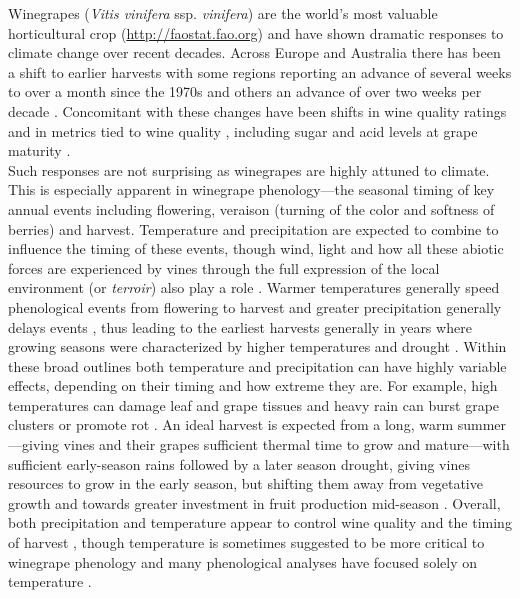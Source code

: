 \documentclass[11pt,a4paper,oneside]{article}
\begin{document}
Winegrapes (\emph{Vitis vinifera} ssp. \emph{vinifera}) are the world's most valuable horticultural crop (\url{http://faostat.fao.org}) and have shown dramatic responses to climate change over recent decades. Across Europe \citep{Jones:2000br,schultzjones,tomasi2011,odo2012} and Australia \citep{webb2012} there has been a shift to earlier harvests with some regions reporting an advance of several weeks to over a month since the 1970s \citep{Duchene:2005bd,Seguin2005} and others an advance of over two weeks per decade \citep{webb2011}. Concomitant with these changes have been shifts in wine quality ratings \citep{jones2005} and in metrics tied to wine quality \citep{mori2007}, including sugar and acid levels at grape maturity \citep{Jones:2000br}.\\

Such responses are not surprising as winegrapes are highly attuned to climate. This is especially apparent in winegrape phenology---the seasonal timing of key annual events including flowering, veraison (turning of the color and softness of berries) and harvest. Temperature and precipitation are expected to combine to influence the timing of these events, though wind, light and how all these abiotic forces are experienced by vines through the full expression of the local environment (or \emph{terroir}) also play a role \citep{Gladstones2011}. Warmer temperatures generally speed phenological events from flowering to harvest and greater precipitation generally delays events \citep{jones2013}, thus leading to the earliest harvests generally in years where growing seasons were characterized by higher temperatures and drought \citep{Jones:2000br}. Within these broad outlines both temperature and precipitation can have highly variable effects, depending on their timing and how extreme they are. For example, high temperatures can damage leaf and grape tissues \citep{greer2010,Gladstones2011} and heavy rain can burst grape clusters or promote rot \citep{jones2013}. An ideal harvest is expected from a long, warm summer---giving vines and their grapes sufficient thermal time to grow and mature---with sufficient early-season rains followed by a later season drought, giving vines resources to grow in the early season, but shifting them away from vegetative growth and towards greater investment in fruit production mid-season \citep{chaves2010,jones2013,baciocco2014}. Overall, both precipitation \citep{vanlee2009} and temperature \citep{baciocco2014} appear to control wine quality and the timing of harvest \citep{odo2012,webb2012}, though temperature is sometimes suggested to be more critical to winegrape phenology \citep{coombe1987} and many phenological analyses have focused solely on temperature \citep[e.g.,][]{jones2005}.\\
\end{document}

